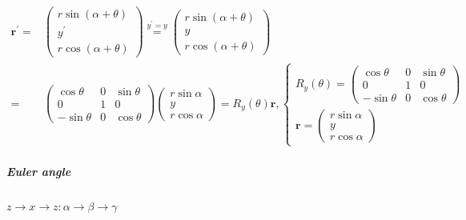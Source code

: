 \documentclass[
]{book}
\theoremstyle{definition}
\theoremstyle{definition}
\theoremstyle{definition}
\theoremstyle{definition}
\theoremstyle{remark}
\begin{document}
\[
\begin{aligned}
\boldsymbol{r}^{\prime}= & \begin{pmatrix}r\sin\left(\alpha+\theta\right)\\
y^{\prime}\\
r\cos\left(\alpha+\theta\right)
\end{pmatrix}\overset{y^{\prime}=y}{=}\begin{pmatrix}r\sin\left(\alpha+\theta\right)\\
y\\
r\cos\left(\alpha+\theta\right)
\end{pmatrix}\\
= & \begin{pmatrix}\cos\theta & 0 & \sin\theta\\
0 & 1 & 0\\
-\sin\theta & 0 & \cos\theta
\end{pmatrix}\begin{pmatrix}r\sin\alpha\\
y\\
r\cos\alpha
\end{pmatrix}=R_{{\scriptscriptstyle y}}\left(\theta\right)\boldsymbol{r},\begin{cases}
R_{{\scriptscriptstyle y}}\left(\theta\right)=\begin{pmatrix}\cos\theta & 0 & \sin\theta\\
0 & 1 & 0\\
-\sin\theta & 0 & \cos\theta
\end{pmatrix}\\
\boldsymbol{r}=\begin{pmatrix}r\sin\alpha\\
y\\
r\cos\alpha
\end{pmatrix}
\end{cases}
\end{aligned}
\]

\hypertarget{euler-angle}{%
\subparagraph{Euler angle}\label{euler-angle}}

\(z\rightarrow x\rightarrow z:\alpha\rightarrow\beta\rightarrow\gamma\)
\end{document}
